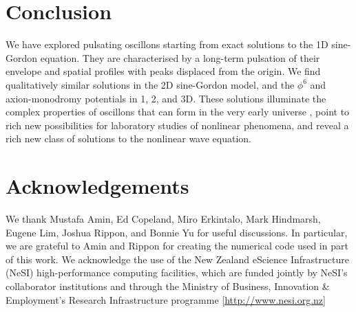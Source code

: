 \documentclass[%
reprint,
superscriptaddress,
amsmath,amssymb,
aps,
prd,
floatfix,
nofootinbib
]{revtex4-1}
\begin{document}
\section{Conclusion} We have explored  pulsating oscillons starting from exact solutions to the 1D sine-Gordon equation. They are characterised by a long-term pulsation of their envelope and spatial profiles with peaks displaced from the origin. We find qualitatively similar solutions in the  2D sine-Gordon model, and the $\phi^6$ and axion-monodromy potentials in 1, 2, and 3D. These solutions illuminate the complex properties of  oscillons that can form in the very early universe \cite{Amin:2011hj}, point to rich new possibilities for  laboratory  studies of nonlinear phenomena, and reveal a rich new class of solutions to the nonlinear wave equation.

\section*{Acknowledgements}

We thank Mustafa Amin, Ed Copeland, Miro Erkintalo, Mark Hindmarsh, Eugene Lim, Joshua Rippon, and Bonnie Yu for useful discussions. In particular, we are grateful to Amin and Rippon for creating the numerical code used in part of this work.  We acknowledge the use of the New Zealand eScience Infrastructure (NeSI) high-performance computing facilities, which are funded jointly by NeSI's collaborator institutions and through the Ministry of Business, Innovation \& Employment's Research Infrastructure programme [\url{http://www.nesi.org.nz}]



\end{document}
